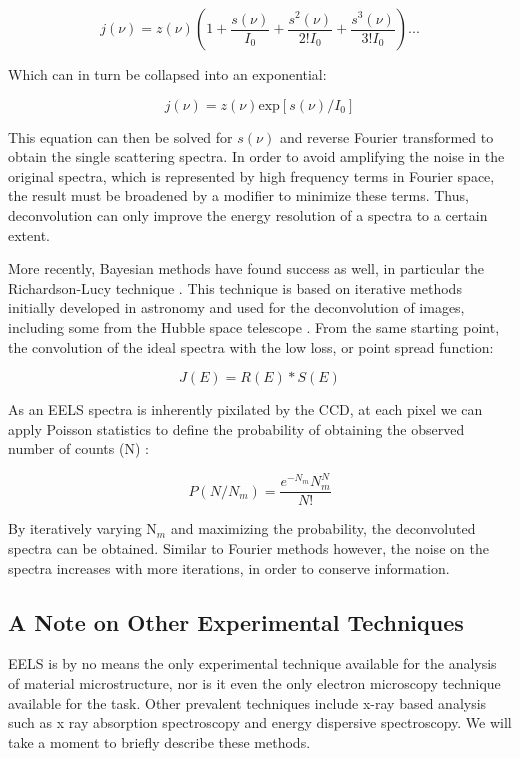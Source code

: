 \begin{equation}
	j(\nu) = z(\nu) (1+\frac{s(\nu)}{I_0}+   \frac{s^2(\nu)}{2! I_0}+ \frac{s^3(\nu)}{3! I_0})...
	\label{fourier_spectra}
\end{equation} 

Which can in turn be collapsed into an exponential:

\begin{equation}
	j(\nu) = z(\nu)\mathrm{exp}[s(\nu)/I_0]
\end{equation}

This equation can then be solved for $s(\nu)$ and reverse Fourier transformed to obtain the single scattering spectra.  In order to avoid amplifying the noise in the original spectra, which is represented by high frequency terms in Fourier space, the result must be broadened by a modifier to minimize these terms.  Thus, deconvolution can only improve the energy resolution of a spectra to a certain extent.  

More recently, Bayesian methods have found success as well, in particular the Richardson-Lucy technique \cite{richardson_lucy}. This technique is based on iterative methods initially developed in astronomy and used for the deconvolution of images, including some from the Hubble space telescope \cite{hubble}.  From the same starting point, the convolution of the ideal spectra with the low loss, or point spread function:

\begin{equation}
J(E) = R(E)\ast S(E)
\end{equation}

As an EELS spectra is inherently pixilated by the CCD, at each pixel we can apply Poisson statistics to define the probability of obtaining the observed number of counts (N) \cite{richardson_lucy}:  

\begin{equation}
	P (N/N_m) = \frac{e^{-N_m}N^N_m}{N!}
\end{equation}

By iteratively varying N$_m$ and maximizing the probability, the deconvoluted spectra can be obtained.  Similar to Fourier methods however, the noise on the spectra increases with more iterations, in order to conserve information.   


\subsection{A Note on Other Experimental Techniques}
EELS is by no means the only experimental technique available for the analysis of material microstructure, nor is it even the only electron microscopy technique available for the task. Other prevalent techniques include x-ray based analysis such as x ray absorption spectroscopy and energy dispersive spectroscopy.  We will take a moment to briefly describe these methods.

